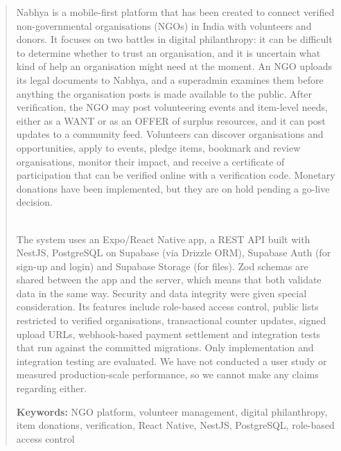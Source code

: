 \begin{abstract}
Nabhya is a mobile-first platform that has been created to connect verified non-governmental organisations (NGOs) in India with volunteers and donors. It focuses on two battles in digital philanthropy: it can be difficult to determine whether to trust an organisation, and it is uncertain what kind of help an organisation might need at the moment. An NGO uploads its legal documents to Nabhya, and a superadmin examines them before anything the organisation posts is made available to the public. After verification, the NGO may post volunteering events and item-level needs, either as a WANT or as an OFFER of surplus resources, and it can post updates to a community feed. Volunteers can discover organisations and opportunities, apply to events, pledge items, bookmark and review organisations, monitor their impact, and receive a certificate of participation that can be verified online with a verification code. Monetary donations have been implemented, but they are on hold pending a go-live decision.

\noindent \\ The system uses an Expo/React Native app, a REST API built with NestJS, PostgreSQL on Supabase (via Drizzle ORM), Supabase Auth (for sign-up and login) and Supabase Storage (for files). Zod schemas are shared between the app and the server, which means that both validate data in the same way. Security and data integrity were given special consideration. Its features include role-based access control, public lists restricted to verified organisations, transactional counter updates, signed upload URLs, webhook-based payment settlement and integration tests that run against the committed migrations. Only implementation and integration testing are evaluated. We have not conducted a user study or measured production-scale performance, so we cannot make any claims regarding either.
\vspace{0.15in}

\noindent\textbf{Keywords:} NGO platform, volunteer management, digital philanthropy, item donations, verification, React Native, NestJS, PostgreSQL, role-based access control
\end{abstract}

\tableofcontents
\listoffigures
\listoftables

